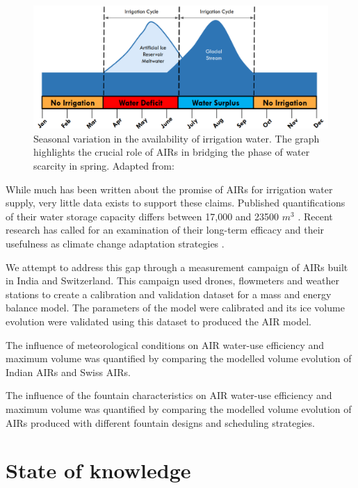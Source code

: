 \begin{figure}[t]
\centering
\includegraphics[width=12cm]{Figures/irrigation_cycles.png}

\caption{Seasonal variation in the availability of irrigation water. The graph highlights the crucial role of
AIRs in bridging the phase of water scarcity in spring. Adapted from: \cite{nusserLocalKnowledgeGlobal2016}}

\label{fig:irrigation_cycles}
\end{figure}

While much has been written about the promise of AIRs for irrigation water supply, very little data exists to
support these claims. Published quantifications of their water storage capacity differs between 17,000 and 23500
$m^3$ \citep{norphelSnowWaterHarvesting2015, baglaArtificialGlaciersHelp1998}. Recent research has called for an
examination of their long-term efficacy and their usefulness as climate change adaptation strategies
\citep{clouseLadakhArtificialGlaciers2017}. 

We attempt to address this gap through a measurement campaign of AIRs built in India and Switzerland. This
campaign used drones, flowmeters and weather stations to create a calibration and validation dataset for a mass
and energy balance model. The parameters of the model were calibrated and its ice volume evolution were
validated using this dataset to produced the AIR model. 

The influence of meteorological conditions on AIR water-use efficiency and maximum volume was quantified by
comparing the modelled volume evolution of Indian AIRs and Swiss AIRs.

The influence of the fountain characteristics on AIR water-use efficiency and maximum volume was quantified by
comparing the modelled volume evolution of AIRs produced with different fountain designs and scheduling
strategies.

\section{State of knowledge}

